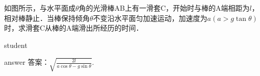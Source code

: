 \begin{example}
	 如图所示，与水平面成$ \theta $角的光滑棒AB上有一滑套C，开始时与棒的A端相距为$ l $，相对棒静止．当棒保持倾角$ \theta $不变沿水平面匀加速运动，加速度为$a(a>g\tan\theta)$时，求滑套C从棒的A端滑出所经历的时间．
	
	\begin{taggedblock}{student}
		\vspace*{2cm}
	\end{taggedblock}
	
	
	\begin{taggedblock}{answer}
		答案：$ \sqrt{\frac{2l}{a\cos\theta-g\sin\theta}} $.
	\end{taggedblock}
	

\end{example}
